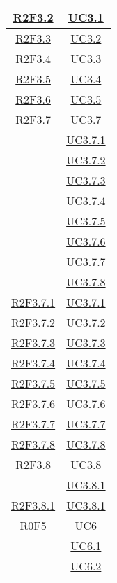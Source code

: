\begin{longtable}{|c|c|}
\hline
\hyperlink{R2F3.2}{R2F3.2} & \hyperlink{UC3.1}{UC3.1}\\
\hline
\hyperlink{R2F3.3}{R2F3.3} & \hyperlink{UC3.2}{UC3.2}\\
\hline
\hyperlink{R2F3.4}{R2F3.4} & \hyperlink{UC3.3}{UC3.3}\\
\hline
\hyperlink{R2F3.5}{R2F3.5} & \hyperlink{UC3.4}{UC3.4}\\
\hline
\hyperlink{R2F3.6}{R2F3.6} & \hyperlink{UC3.5}{UC3.5}\\
\hline
\hyperlink{R2F3.7}{R2F3.7} & \hyperlink{UC3.7}{UC3.7}\\
& \hyperlink{UC3.7.1}{UC3.7.1}\\
& \hyperlink{UC3.7.2}{UC3.7.2}\\
& \hyperlink{UC3.7.3}{UC3.7.3}\\
& \hyperlink{UC3.7.4}{UC3.7.4}\\
& \hyperlink{UC3.7.5}{UC3.7.5}\\
& \hyperlink{UC3.7.6}{UC3.7.6}\\
& \hyperlink{UC3.7.7}{UC3.7.7}\\
& \hyperlink{UC3.7.8}{UC3.7.8}\\
\hline
\hyperlink{R2F3.7.1}{R2F3.7.1} & \hyperlink{UC3.7.1}{UC3.7.1}\\
\hline
\hyperlink{R2F3.7.2}{R2F3.7.2} & \hyperlink{UC3.7.2}{UC3.7.2}\\
\hline
\hyperlink{R2F3.7.3}{R2F3.7.3} & \hyperlink{UC3.7.3}{UC3.7.3}\\
\hline
\hyperlink{R2F3.7.4}{R2F3.7.4} & \hyperlink{UC3.7.4}{UC3.7.4}\\
\hline
\hyperlink{R2F3.7.5}{R2F3.7.5} & \hyperlink{UC3.7.5}{UC3.7.5}\\
\hline
\hyperlink{R2F3.7.6}{R2F3.7.6} & \hyperlink{UC3.7.6}{UC3.7.6}\\
\hline
\hyperlink{R2F3.7.7}{R2F3.7.7} & \hyperlink{UC3.7.7}{UC3.7.7}\\
\hline
\hyperlink{R2F3.7.8}{R2F3.7.8} & \hyperlink{UC3.7.8}{UC3.7.8}\\
\hline
\hyperlink{R2F3.8}{R2F3.8} & \hyperlink{UC3.8}{UC3.8}\\
& \hyperlink{UC3.8.1}{UC3.8.1}\\
\hline
\hyperlink{R2F3.8.1}{R2F3.8.1} & \hyperlink{UC3.8.1}{UC3.8.1}\\
\hline
\hyperlink{R0F5}{R0F5} & \hyperlink{UC6}{UC6}\\
& \hyperlink{UC6.1}{UC6.1}\\
& \hyperlink{UC6.2}{UC6.2}\\

\end{longtable}
